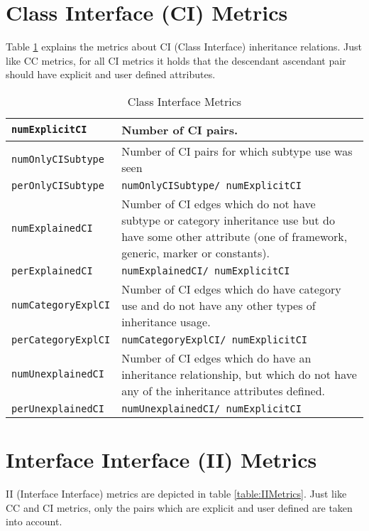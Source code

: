 \documentclass{uvamscse}
\begin{document}
\section{Class Interface (CI) Metrics}
Table \ref{table:CIMetrics} explains the metrics about CI (Class Interface) inheritance relations. Just like CC metrics, for all CI metrics it holds that the descendant ascendant pair should have explicit and user defined attributes.

\begin{table} [h!]
\begin{flushleft}
\begin{tabular}[c]{| p{40mm} | p{110mm} |}
  \hline
  \texttt{numExplicitCI} &  Number of CI pairs.\\
  \hline  
  \texttt{numOnlyCISubtype} &  Number of CI pairs for which subtype use was seen \\
  \texttt{perOnlyCISubtype} &  \texttt{numOnlyCISubtype/ numExplicitCI} \\
  \hline
  \texttt{numExplainedCI} & Number of CI edges which do not have subtype or category inheritance use but do have some other attribute (one of framework, generic, marker or constants). \\
  \texttt{perExplainedCI} & 	\texttt{numExplainedCI/ numExplicitCI} \\
  \hline 
  \texttt{numCategoryExplCI} & Number of CI edges which do have category use and do not have any other types of inheritance usage. \\
  \texttt{perCategoryExplCI} & 	\texttt{numCategoryExplCI/ numExplicitCI} \\
  \hline 
  \texttt{numUnexplainedCI} & Number of CI edges which do have an inheritance relationship, but which do not have any of the inheritance attributes defined. \\
  \texttt{perUnexplainedCI} & 	\texttt{numUnexplainedCI/ numExplicitCI } \\
  \hline 
\end{tabular}
\end{flushleft}
\caption{Class Interface Metrics}
\label{table:CIMetrics}
\end{table}


\section{Interface Interface (II) Metrics}
II (Interface Interface) metrics are depicted in table \ref{table:IIMetrics}. Just like CC and CI metrics, only the pairs which are explicit and user defined are taken into account.
\end{document}
